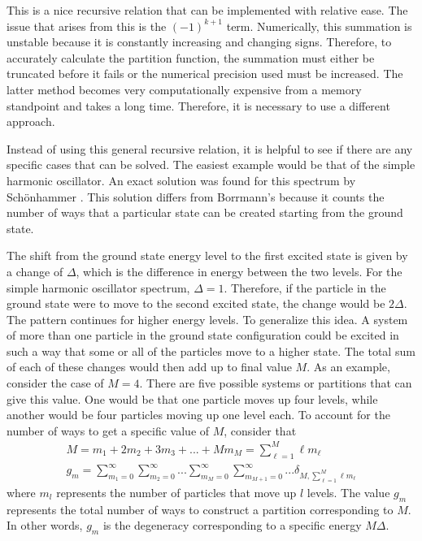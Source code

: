 This is a nice recursive relation that can be implemented with relative ease. The issue that arises from this is the $(-1)^{k+1}$ term. Numerically, this summation is unstable because it is constantly increasing and changing signs. Therefore, to accurately calculate the partition function, the summation must either be truncated before it fails or the numerical precision used must be increased. The latter method becomes very computationally expensive from a memory standpoint and takes a long time. Therefore, it is necessary to use a different approach. 


Instead of using this general recursive relation, it is helpful to see if there are any specific cases that can be solved. The easiest example would be that of the simple harmonic oscillator. An exact solution was found for this spectrum by Sch\"onhammer \cite{Schon1996}. This solution differs from Borrmann's because it counts the number of ways that a particular state can be created starting from the ground state. 

The shift from the ground state energy level to the first excited state is given by a change of $\Delta$, which is the difference in energy between the two levels. For the simple harmonic oscillator spectrum, $\Delta=1$. Therefore, if the particle in the ground state were to move to the second excited state, the change would be $2\Delta$. The pattern continues for higher energy levels. To generalize this idea. A system of more than one particle in the ground state configuration could be excited in such a way that some or all of the particles move to a higher state. The total sum of each of these changes would then add up to final value $M$. As an example, consider the case of $M=4$. There are five possible systems or partitions that can give this value. One would be that one particle moves up four levels, while another would be four particles moving up one level each. To account for the number of ways to get a specific value of $M$, consider that
\begin{gather}
    M=m_1+2m_2+3m_3+...+Mm_M=\sum_{\ell=1}^M \ell m_{\ell}\\
    g_m=\sum_{m_1=0}^{\infty}\sum_{m_2=0}^{\infty}...\sum_{m_M=0}^{\infty}\sum_{m_{M+1}=0}^{\infty}...\delta_{M,\sum_{\ell=1}^M \ell m_{\ell}}
\end{gather}
where $m_l$ represents the number of particles that move up $l$ levels. The value $g_m$ represents the total number of ways to construct a partition corresponding to $M$. In other words, $g_m$ is the degeneracy corresponding to a specific energy $M\Delta$.  


